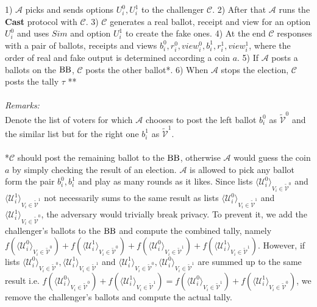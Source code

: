  1)  $\mathcal{A}$ picks and sends options $U_i^0, U_i^1$ to the challenger $\mathcal{C}$. 2) After that $\mathcal{A}$ runs the \textbf{Cast} protocol with $\mathcal{C}$. 3) $\mathcal{C}$ generates a real ballot, receipt and view for an option $U_i^0$ and uses $Sim$ and option $U_i^1$ to create the fake ones.  4) At the end $\mathcal{C}$ responses with a pair of ballots, receipts and views $b_i^0,r_i^0,view_i^0,b_i^1,r_i^1,view_i^1$, where the order of real and fake output is determined according a coin $a$. 5) If $\mathcal{A}$ posts a ballots on the $\operatorname{BB}$, $\mathcal{C}$ posts the other ballot*. 6)  When $\mathcal{A}$ stops the election, $\mathcal{C}$ posts the tally $\tau$ ** \\\\
\textit{Remarks:}\\
Denote the list of voters for which $\mathcal{A}$ chooses to post the left ballot $b_i^0$  as $ \tilde{\mathcal{V}}^0$ and the similar list but for the right one $b_i^1$ as $ \tilde{\mathcal{V}}^1$. \\\\
*$\mathcal{C}$ should post the remaining ballot to the $\operatorname{BB}$, otherwise  $\mathcal{A}$  would guess the coin $a$ by simply checking the result of an election.  $\mathcal{A}$ is allowed to pick any ballot form the pair $b_i^0,b_i^1$  and play as many rounds as it likes. Since lists $\langle \mathcal{U}^0_i \rangle _{V_i \in \tilde{\mathcal{V}}^0} $ and  $\langle \mathcal{U}^1_i \rangle _{V_i \in \tilde{\mathcal{V}}^1} $  not necessarily  sums to  the same result as lists  $\langle \mathcal{U}^0_i \rangle _{V_i \in \tilde{\mathcal{V}}^1} $ and  $\langle \mathcal{U}^1_i \rangle _{V_i \in \tilde{\mathcal{V}}^0} $, the adversary would trivially break privacy. To prevent it, we add the challenger's ballots to the $\operatorname{BB}$ and compute the combined tally, namely $f(\langle \mathcal{U}^0_i \rangle _{V_i \in \tilde{\mathcal{V}}^0} ) + f(\langle \mathcal{U}^1_i \rangle _{V_i \in \tilde{\mathcal{V}}^0} )+ f(\langle \mathcal{U}^0_i \rangle _{V_i \in \tilde{\mathcal{V}}^1} ) +  f(\langle \mathcal{U}^1_i \rangle _{V_i \in \tilde{\mathcal{V}}^1} )$. However, if lists $\langle \mathcal{U}^0_i \rangle _{V_i \in \tilde{\mathcal{V}}^0}, \langle \mathcal{U}^1_i \rangle _{V_i \in \tilde{\mathcal{V}}^1}$ and $\langle \mathcal{U}^1_i \rangle _{V_i \in \tilde{\mathcal{V}}^0}, \langle \mathcal{U}^0_i \rangle _{V_i \in \tilde{\mathcal{V}}^1}$ are summed up to the same result i.e. $f(\langle \mathcal{U}^0_i \rangle _{V_i \in \tilde{\mathcal{V}}^0} ) + f(\langle \mathcal{U}^1_i \rangle _{V_i \in \tilde{\mathcal{V}}^1} ) =  f(\langle \mathcal{U}^0_i \rangle _{V_i \in \tilde{\mathcal{V}}^1} ) +  f(\langle \mathcal{U}^1_i \rangle _{V_i \in \tilde{\mathcal{V}}^0} )$, we remove the challenger's ballots and compute the actual tally. \\\\
